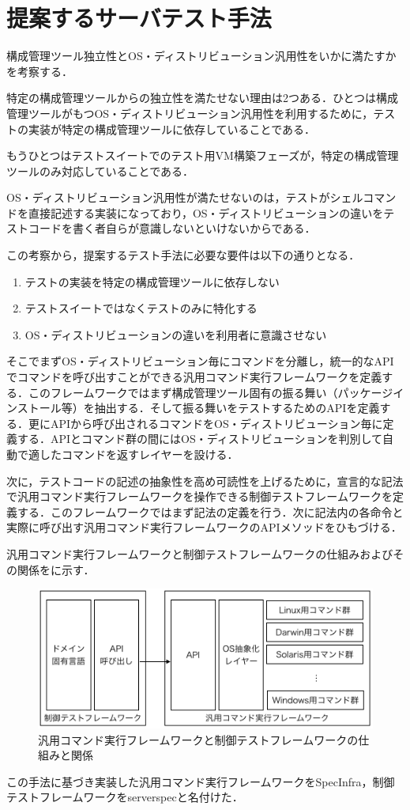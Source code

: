 \section{提案するサーバテスト手法}

構成管理ツール独立性とOS・ディストリビューション汎用性をいかに満たすかを考察する．

特定の構成管理ツールからの独立性を満たせない理由は2つある．ひとつは構成管理ツールがもつOS・ディストリビューション汎用性を利用するために，テストの実装が特定の構成管理ツールに依存していることである．

もうひとつはテストスイートでのテスト用VM構築フェーズが，特定の構成管理ツールのみ対応していることである．

OS・ディストリビューション汎用性が満たせないのは，テストがシェルコマンドを直接記述する実装になっており，OS・ディストリビューションの違いをテストコードを書く者自らが意識しないといけないからである．

この考察から，提案するテスト手法に必要な要件は以下の通りとなる．

\begin{enumerate}
  \item テストの実装を特定の構成管理ツールに依存しない
  \item テストスイートではなくテストのみに特化する
  \item OS・ディストリビューションの違いを利用者に意識させない
\end{enumerate}

そこでまずOS・ディストリビューション毎にコマンドを分離し，統一的なAPIでコマンドを呼び出すことができる汎用コマンド実行フレームワークを定義する．このフレームワークではまず構成管理ツール固有の振る舞い（パッケージインストール等）を抽出する．そして振る舞いをテストするためのAPIを定義する．更にAPIから呼び出されるコマンドをOS・ディストリビューション毎に定義する．APIとコマンド群の間にはOS・ディストリビューションを判別して自動で適したコマンドを返すレイヤーを設ける．

次に，テストコードの記述の抽象性を高め可読性を上げるために，宣言的な記法で汎用コマンド実行フレームワークを操作できる制御テストフレームワークを定義する．このフレームワークではまず記法の定義を行う．次に記法内の各命令と実際に呼び出す汎用コマンド実行フレームワークのAPIメソッドをひもづける．

汎用コマンド実行フレームワークと制御テストフレームワークの仕組みおよびその関係をに示す．

\begin{figure}[tb]
  \includegraphics{framework-overview.png}
  \caption{汎用コマンド実行フレームワークと制御テストフレームワークの仕組みと関係}
  \label{fig:framework}
\end{figure}

この手法に基づき実装した汎用コマンド実行フレームワークをSpecInfra\cite{specinfra}，制御テストフレームワークをserverspec\cite{serverspec}と名付けた．

